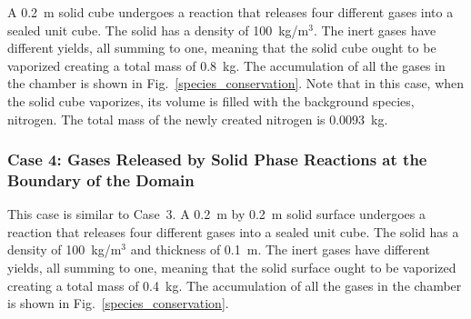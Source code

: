 \documentclass[11pt]{book}
\begin{document}
 A 0.2~m solid cube undergoes a reaction that releases four different gases into a sealed unit cube. The solid has a density of 100~kg/m$^3$. The inert gases have different yields, all summing to one, meaning that the solid cube ought to be vaporized creating a total mass of 0.8~kg. The accumulation of all the gases in the chamber is shown in Fig.~\ref{species_conservation}. Note that in this case, when the solid cube vaporizes, its volume is filled with the background species, nitrogen. The total mass of the newly created nitrogen is 0.0093~kg.

\subsubsection{Case 4: Gases Released by Solid Phase Reactions at the Boundary of the Domain}

 This case is similar to Case~3. A 0.2~m by 0.2~m solid surface undergoes a reaction that releases four different gases into a sealed unit cube. The solid has a density of 100~kg/m$^3$ and thickness of 0.1~m. The inert gases have different yields, all summing to one, meaning that the solid surface ought to be vaporized creating a total mass of 0.4~kg. The accumulation of all the gases in the chamber is shown in Fig.~\ref{species_conservation}.
\end{document}
